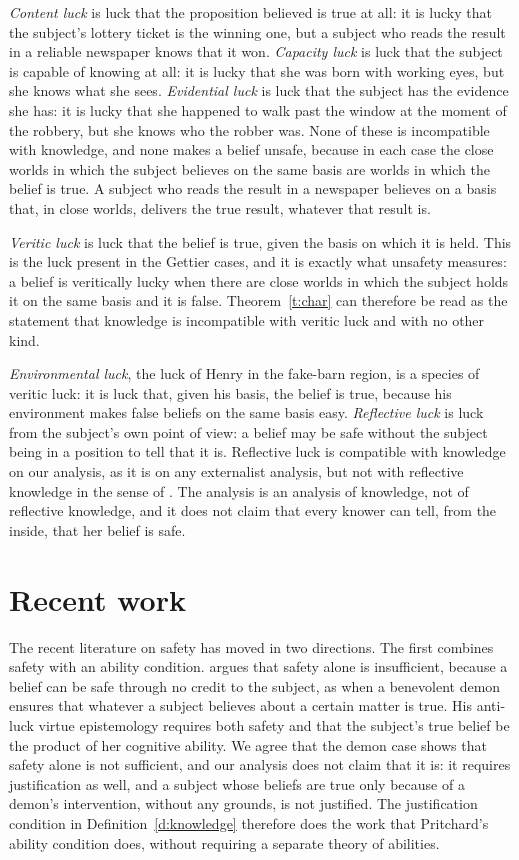 \documentclass{situationist-preprint}
\begin{document}
\emph{Content luck} is luck that the proposition believed is true at all: it is lucky that the subject's lottery ticket is the winning one, but a subject who reads the result in a reliable newspaper knows that it won. \emph{Capacity luck} is luck that the subject is capable of knowing at all: it is lucky that she was born with working eyes, but she knows what she sees. \emph{Evidential luck} is luck that the subject has the evidence she has: it is lucky that she happened to walk past the window at the moment of the robbery, but she knows who the robber was. None of these is incompatible with knowledge, and none makes a belief unsafe, because in each case the close worlds in which the subject believes on the same basis are worlds in which the belief is true. A subject who reads the result in a newspaper believes on a basis that, in close worlds, delivers the true result, whatever that result is.

\emph{Veritic luck} is luck that the belief is true, given the basis on which it is held. This is the luck present in the Gettier cases, and it is exactly what unsafety measures: a belief is veritically lucky when there are close worlds in which the subject holds it on the same basis and it is false. Theorem~\ref{t:char} can therefore be read as the statement that knowledge is incompatible with veritic luck and with no other kind.

\emph{Environmental luck}, the luck of Henry in the fake-barn region, is a species of veritic luck: it is luck that, given his basis, the belief is true, because his environment makes false beliefs on the same basis easy. \emph{Reflective luck} is luck from the subject's own point of view: a belief may be safe without the subject being in a position to tell that it is. Reflective luck is compatible with knowledge on our analysis, as it is on any externalist analysis, but not with reflective knowledge in the sense of \citet{Sosa2007}. The analysis is an analysis of knowledge, not of reflective knowledge, and it does not claim that every knower can tell, from the inside, that her belief is safe.

\section{Recent work}

The recent literature on safety has moved in two directions. The first combines safety with an ability condition. \citet{Pritchard2012} argues that safety alone is insufficient, because a belief can be safe through no credit to the subject, as when a benevolent demon ensures that whatever a subject believes about a certain matter is true. His anti-luck virtue epistemology requires both safety and that the subject's true belief be the product of her cognitive ability. We agree that the demon case shows that safety alone is not sufficient, and our analysis does not claim that it is: it requires justification as well, and a subject whose beliefs are true only because of a demon's intervention, without any grounds, is not justified. The justification condition in Definition~\ref{d:knowledge} therefore does the work that Pritchard's ability condition does, without requiring a separate theory of abilities.
\end{document}
